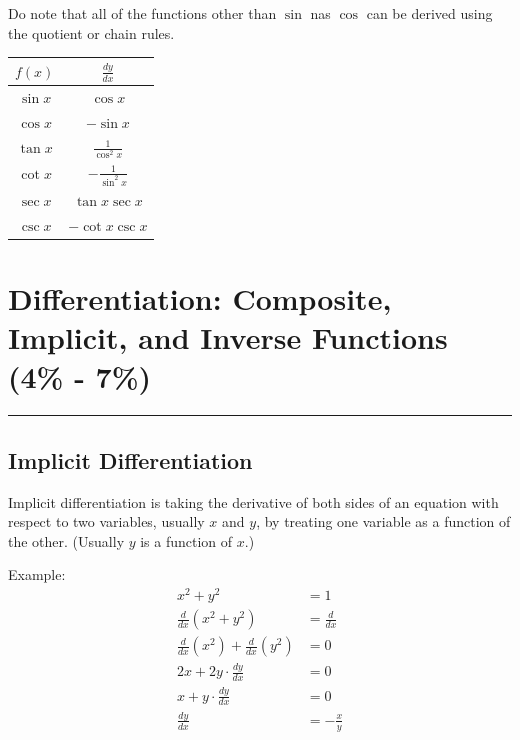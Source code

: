 \documentclass[12pt]{article}
\newcommand{\fline}{\par\noindent\rule{\textwidth}{0.1pt}} %
\begin{document}
Do note that all of the functions other than $\sin$ nas $\cos$ can be derived using the quotient or chain rules.
\begin{center}
	\begin{tabular}{|c|c|}
		\hline
		$f(x)$    & $\frac{dy}{dx}$        \\
		\hline \hline
		$\sin{x}$ & $\cos{x}$              \\
		\hline
		$\cos{x}$ & $-\sin{x}$             \\
		\hline
		$\tan{x}$ & $\frac{1}{\cos^2{x}}$  \\
		\hline \hline
		$\cot{x}$ & $-\frac{1}{\sin^2{x}}$ \\
		\hline
		$\sec{x}$ & $\tan{x} \sec{x}$      \\
		\hline
		$\csc{x}$ & $-\cot{x} \csc{x}$     \\
		\hline
	\end{tabular}
\end{center}

\section{Differentiation: Composite, Implicit, and Inverse Functions (4\% - 7\%)}
\fline
\subsection{Implicit Differentiation}
Implicit differentiation is taking the derivative of both sides of an equation with respect to two variables, usually $x$ and $y$, by treating one variable as a function of the other. (Usually $y$ is a function of $x$.)

\noindent Example:
\begin{align*}
	x^2 + y^2                                                         & = 1            \\
	\frac{d}{dx} \left( x^2 + y^2 \right)                             & = \frac{d}{dx} \\[6pt]
	\frac{d}{dx} \left( x^2 \right) + \frac{d}{dx} \left( y^2 \right) & = 0            \\[6pt]
	2x + 2y \cdot \frac{dy}{dx}                                       & = 0            \\[6pt]
	x + y \cdot \frac{dy}{dx}                                         & = 0            \\[6pt]
	\frac{dy}{dx}                                                     & = -\frac{x}{y}
\end{align*}
\end{document}
